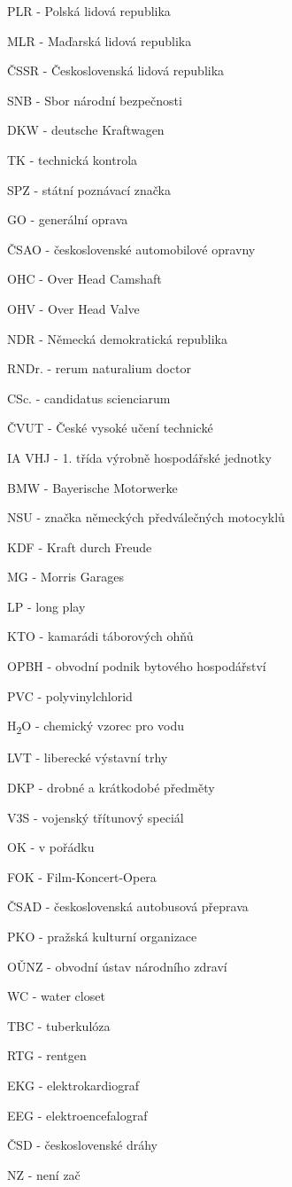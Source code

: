 \begin{multicols}{2}
\begin{small}
PLR - Polská lidová republika

MLR - Maďarská lidová republika

ČSSR - Československá lidová republika

SNB - Sbor národní bezpečnosti

DKW - deutsche Kraftwagen

TK - technická kontrola

SPZ - státní poznávací značka

GO - generální oprava

ČSAO - československé automobilové opravny

OHC - Over Head Camshaft

OHV - Over Head Valve

NDR - Německá demokratická republika

RNDr. - rerum naturalium doctor

CSc. - candidatus scienciarum

ČVUT - České vysoké učení technické

IA VHJ - 1. třída výrobně hospodářské jednotky

BMW - Bayerische Motorwerke

NSU - značka německých předválečných motocyklů

KDF - Kraft durch Freude

MG - Morris Garages

LP - long play

KTO - kamarádi táborových ohňů

OPBH - obvodní podnik bytového hospodářství

PVC - polyvinylchlorid

H\textsubscript{2}O - chemický vzorec pro vodu

LVT - liberecké výstavní trhy

DKP - drobné a krátkodobé předměty

V3S - vojenský třítunový speciál

OK - v pořádku

FOK - Film-Koncert-Opera

ČSAD - československá autobusová přeprava

PKO - pražská kulturní organizace

OǓNZ - obvodní ústav národního zdraví

WC - water closet

TBC - tuberkulóza

RTG - rentgen

EKG - elektrokardiograf

EEG - elektroencefalograf

ČSD - československé dráhy

NZ - není zač
\end{small}
\end{multicols}
\newpage
